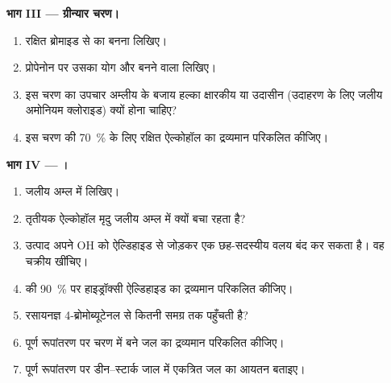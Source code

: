 \begin{problem}
\medskip
\noindent\textbf{भाग III --- ग्रीन्यार चरण।}
\begin{enumerate}[resume]
  \item रक्षित ब्रोमाइड से  का बनना
        लिखिए।
  \item प्रोपेनोन पर उसका योग और बनने वाला  लिखिए।
  \item इस चरण का उपचार अम्लीय के बजाय हल्का क्षारकीय या उदासीन (उदाहरण के लिए
        जलीय अमोनियम क्लोराइड) क्यों होना चाहिए?
  \item इस चरण की \qty{70}{\percent}  के लिए रक्षित ऐल्कोहॉल का
        द्रव्यमान परिकलित कीजिए।
\end{enumerate}

\medskip
\noindent\textbf{भाग IV --- ।}
\begin{enumerate}[resume]
  \item जलीय अम्ल में  लिखिए।
  \item तृतीयक ऐल्कोहॉल मृदु जलीय अम्ल में क्यों बचा रहता है?
  \item उत्पाद अपने OH को ऐल्डिहाइड से जोड़कर एक छह-सदस्यीय वलय बंद कर
        सकता है। वह चक्रीय  खींचिए।
  \item {} की \qty{90}{\percent}  पर हाइड्रॉक्सी ऐल्डिहाइड का
        द्रव्यमान परिकलित कीजिए।
  \item रसायनज्ञ 4-ब्रोमोब्यूटेनल से कितनी समग्र  तक पहुँचती है?
  \item पूर्ण रूपांतरण पर  चरण में बने जल का द्रव्यमान
        परिकलित कीजिए।
  \item पूर्ण रूपांतरण पर डीन--स्टार्क जाल में एकत्रित जल का आयतन
        बताइए।
\end{enumerate}
\end{problem}

